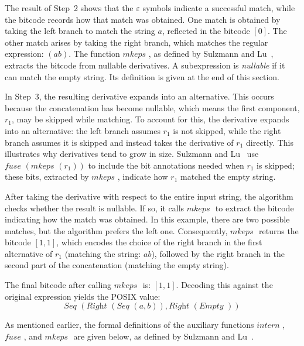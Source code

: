 \documentclass[12pt]{article}
\newcommand{\fuse}{\textit{fuse }}
\newcommand{\mkeps}{\textit{mkeps }}
\newcommand{\intern}{\textit{intern }}
\newcommand{\Seq}{\textit{Seq }}
\newcommand{\Right}{\textit{Right }}
\newcommand{\Empty}{\textit{Empty }}
\begin{document}
The result of Step~2 shows that the $\varepsilon$ symbols indicate a successful match,  
while the bitcode records how that match was obtained.  
One match is obtained by taking the left branch to match the string $a$, reflected in the bitcode $[0]$.  
The other match arises by taking the right branch, which matches the regular expression: $(ab)$.  
The function $\mkeps$, as defined by Sulzmann and Lu~\cite{Sulzmann2014}, extracts the bitcode from nullable derivatives.  
A subexpression is \emph{nullable} if it can match the empty string.  
Its definition is given at the end of this section.  


In Step~3, the resulting derivative expands into an alternative. 
This occurs because the concatenation has become nullable, which means the first component, $r_1$, may be skipped while matching. 
To account for this, the derivative expands into an alternative: the left branch assumes $r_1$ is not skipped, 
while the right branch assumes it is skipped and instead takes the derivative of $r_1$ directly. 
This illustrates why derivatives tend to grow in size. 
Sulzmann and Lu~\cite{Sulzmann2014} use $\fuse(\mkeps(r_1))$ to include the bit annotations needed when $r_1$ is skipped; 
these bits, extracted by $\mkeps$, indicate how $r_1$ matched the empty string.  

After taking the derivative with respect to the entire input string, the algorithm checks whether the result is nullable. 
If so, it calls $\mkeps$ to extract the bitcode indicating how the match was obtained. 
In this example, there are two possible matches, but the algorithm prefers the left one. 
Consequently, $\mkeps$ returns the bitcode $[1,1]$, which encodes the choice of the right branch in the first alternative of $r_1$ 
(matching the string: $ab$), followed by the right branch in the second part of the concatenation (matching the empty string).  

The final bitcode after calling $\mkeps$ is: $[1,1]$. 
Decoding this against the original expression yields the POSIX value:
\[
\Seq(\Right(\Seq(a, b)), \Right(\Empty))
\]

As mentioned earlier, the formal definitions of the auxiliary functions $\intern$, $\fuse$, and $\mkeps$ are given below, 
as defined by Sulzmann and Lu~\cite{Sulzmann2014}.
\end{document}
